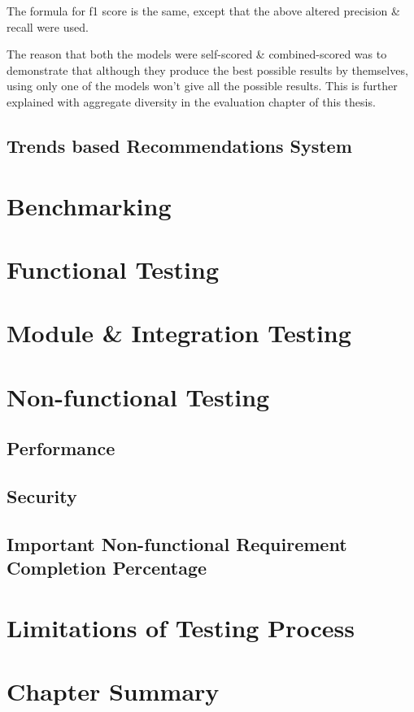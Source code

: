 The formula for f1 score is the same, except that the above altered precision \& recall were used.

The reason that both the models were self-scored \& combined-scored was to demonstrate that although they produce the best possible results by themselves, using only one of the models won't give all the possible results. This is further explained with aggregate diversity in the evaluation chapter of this thesis.




\subsection{Trends based Recommendations System}



\section{Benchmarking}


\section{Functional Testing}


\section{Module \& Integration Testing}


\section{Non-functional Testing}

\subsection{Performance}

\subsection{Security}

\subsection{Important Non-functional Requirement Completion Percentage}

\section{Limitations of Testing Process}

\section{Chapter Summary}